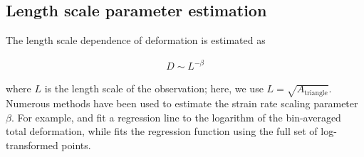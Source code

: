 \documentclass[review, jog]{igs}
\begin{document}
\subsection{Length scale parameter estimation}
The length scale dependence of deformation is estimated as
\begin{linenomath*}
\begin{align}
    D \sim L^{-\beta}
\end{align}
\end{linenomath*}
where $L$ is the length scale of the observation; here, we use $L = \sqrt{A_{\text{triangle}}}$.
Numerous methods have been used to estimate the strain rate scaling parameter $\beta$.
For example, \cite{Marsan2004} and \cite{Hutchings2011} fit a regression line to the logarithm of the bin-averaged total deformation, while \cite{itkin2017_ThinIce} fits the regression function using the full set of log-transformed points.
\end{document}
